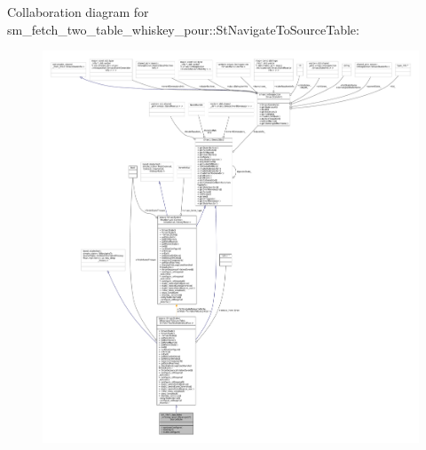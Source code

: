 Collaboration diagram for sm\+\_\+fetch\+\_\+two\+\_\+table\+\_\+whiskey\+\_\+pour\+:\+:St\+Navigate\+To\+Source\+Table\+:
\nopagebreak
\begin{figure}[H]
\begin{center}
\leavevmode
\includegraphics[width=350pt]{structsm__fetch__two__table__whiskey__pour_1_1StNavigateToSourceTable__coll__graph}
\end{center}
\end{figure}
